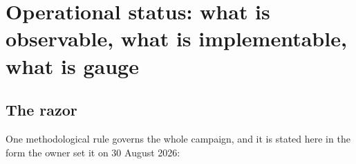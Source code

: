 
\providecommand{\opObs}{\textsc{observable}}
\providecommand{\opImp}{\textsc{implementable}}
\providecommand{\opGauge}{\textsc{gauge}}
\providecommand{\lamt}{\tilde{\lambda}}          %
\providecommand{\PGL}{\mathrm{PGL}}
\providecommand{\Schw}{\operatorname{Sch}}       %
\providecommand{\Diffop}{\operatorname{Diff}}

\section{Operational status: what is observable, what is implementable, what
is gauge}
\label{sec:operational-status}

\subsection{The razor}

One methodological rule governs the whole campaign, and it is stated here in
the form the owner set it on 30 August 2026:

